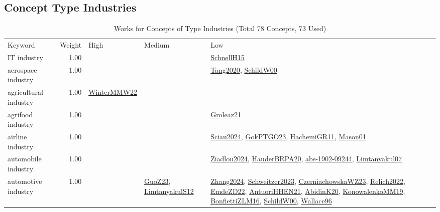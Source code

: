 \subsection{Concept Type Industries}
\label{sec:Industries}
\label{Industries}
{\scriptsize
\begin{longtable}{p{3cm}r>{\raggedright\arraybackslash}p{6cm}>{\raggedright\arraybackslash}p{6cm}>{\raggedright\arraybackslash}p{8cm}}
\rowcolor{white}\caption{Works for Concepts of Type Industries (Total 78 Concepts, 73 Used)}\\ \toprule
\rowcolor{white}Keyword & Weight & High & Medium & Low\\ \midrule\endhead
\bottomrule
\endfoot
\index{IT industry}\index{Industries!IT industry}IT industry &  1.00 &  &  & \hyperref[detail:SchnellH15]{SchnellH15}\\
\index{aerospace industry}\index{Industries!aerospace industry}aerospace industry &  1.00 &  &  & \hyperref[detail:Tang2020]{Tang2020}, \hyperref[detail:SchildW00]{SchildW00}\\
\index{agricultural industry}\index{Industries!agricultural industry}agricultural industry &  1.00 & \hyperref[detail:WinterMMW22]{WinterMMW22} &  & \\
\index{agrifood industry}\index{Industries!agrifood industry}agrifood industry &  1.00 &  &  & \hyperref[detail:Groleaz21]{Groleaz21}\\
\index{airline industry}\index{Industries!airline industry}airline industry &  1.00 &  &  & \hyperref[detail:Sciau2024]{Sciau2024}, \hyperref[detail:GokPTGO23]{GokPTGO23}, \hyperref[detail:HachemiGR11]{HachemiGR11}, \hyperref[detail:Mason01]{Mason01}\\
\index{automobile industry}\index{Industries!automobile industry}automobile industry &  1.00 &  &  & \hyperref[detail:Ziadlou2024]{Ziadlou2024}, \hyperref[detail:HauderBRPA20]{HauderBRPA20}, \hyperref[detail:abs-1902-09244]{abs-1902-09244}, \hyperref[detail:Limtanyakul07]{Limtanyakul07}\\
\index{automotive industry}\index{Industries!automotive industry}automotive industry &  1.00 &  & \hyperref[detail:GuoZ23]{GuoZ23}, \hyperref[detail:LimtanyakulS12]{LimtanyakulS12} & \hyperref[detail:Zhang2024]{Zhang2024}, \hyperref[detail:Schweitzer2023]{Schweitzer2023}, \hyperref[detail:CzerniachowskaWZ23]{CzerniachowskaWZ23}, \hyperref[detail:Relich2022]{Relich2022}, \hyperref[detail:EmdeZD22]{EmdeZD22}, \hyperref[detail:AntuoriHHEN21]{AntuoriHHEN21}, \hyperref[detail:AbidinK20]{AbidinK20}, \hyperref[detail:KonowalenkoMM19]{KonowalenkoMM19}, \hyperref[detail:BonfiettiZLM16]{BonfiettiZLM16}, \hyperref[detail:SchildW00]{SchildW00}, \hyperref[detail:Wallace96]{Wallace96}\\

\end{longtable}}
